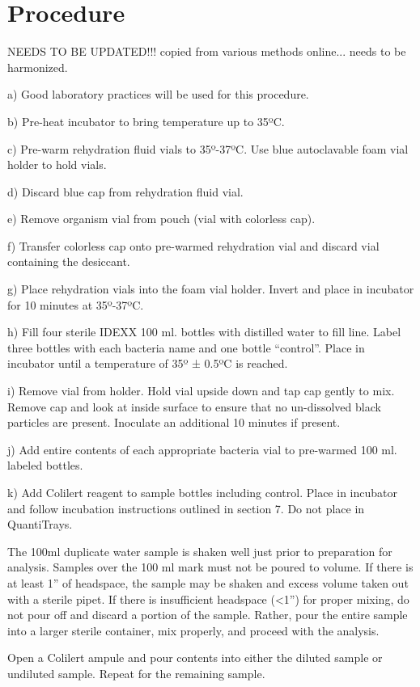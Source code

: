 \documentclass[12pt]{../SOP4_alpha}\usepackage[]{graphicx}\usepackage[]{color}
\begin{document}
\section{Procedure}

NEEDS TO BE UPDATED!!! copied from various methods online... needs to be harmonized.

a) Good laboratory practices will be used for this procedure.

b) Pre-heat incubator to bring temperature up to 35ºC.

c) Pre-warm rehydration fluid vials to 35º-37ºC. Use blue autoclavable foam vial
holder to hold vials.

d) Discard blue cap from rehydration fluid vial.

e) Remove organism vial from pouch (vial with colorless cap).

f) Transfer colorless cap onto pre-warmed rehydration vial and discard vial
containing the desiccant.

g) Place rehydration vials into the foam vial holder. Invert and place in incubator for
10 minutes at 35º-37ºC.

h) Fill four sterile IDEXX 100 ml. bottles with distilled water to fill line. Label
three bottles with each bacteria name and one bottle “control”. Place in incubator
until a temperature of 35º ± 0.5ºC is reached.

i) Remove vial from holder. Hold vial upside down and tap cap gently to mix.
Remove cap and look at inside surface to ensure that no un-dissolved black
particles are present. Inoculate an additional 10 minutes if present.

j) Add entire contents of each appropriate bacteria vial to pre-warmed 100 ml.
labeled bottles.

k) Add Colilert reagent to sample bottles including control. Place in incubator and
follow incubation instructions outlined in section 7. Do not place in QuantiTrays. 

The 100ml duplicate water sample is shaken well just prior to
preparation for analysis. Samples over the 100 ml mark must not be
poured to volume. If there is at least 1” of headspace, the sample
may be shaken and excess volume taken out with a sterile pipet. If
there is insufficient headspace (<1”) for proper mixing, do not pour
off and discard a portion of the sample. Rather, pour the entire
sample into a larger sterile container, mix properly, and proceed with
the analysis.

Open a Colilert ampule and pour contents into either the diluted
sample or undiluted sample. Repeat for the remaining sample.
\end{document}
